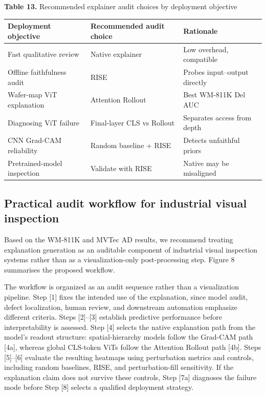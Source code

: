 \documentclass[11pt,a4paper]{article}
\begin{document}
\begin{center}
\small \textbf{Table 13.} Recommended explainer audit choices by deployment objective
\end{center}

\begin{tabular}{lll}
\toprule
Deployment objective & Recommended audit choice & Rationale \\
\midrule
Fast qualitative review & Native explainer & Low overhead, compatible \\
Offline faithfulness audit & RISE & Probes input--output directly \\
Wafer-map ViT explanation & Attention Rollout & Best WM-811K Del AUC \\
Diagnosing ViT failure & Final-layer CLS vs Rollout & Separates access from depth \\
CNN Grad-CAM reliability & Random baseline + RISE & Detects unfaithful priors \\
Pretrained-model inspection & Validate with RISE & Native may be misaligned \\
\bottomrule
\end{tabular}

\clearpage
\subsection{Practical audit workflow for industrial visual inspection}

Based on the WM-811K and MVTec AD results, we recommend treating explanation generation as an auditable component of industrial visual inspection systems rather than as a visualization-only post-processing step. Figure 8 summarises the proposed workflow.

The workflow is organized as an audit sequence rather than a visualization pipeline. Step [1] fixes the intended use of the explanation, since model audit, defect localization, human review, and downstream automation emphasize different criteria. Steps [2]--[3] establish predictive performance before interpretability is assessed. Step [4] selects the native explanation path from the model's readout structure: spatial-hierarchy models follow the Grad-CAM path [4a], whereas global CLS-token ViTs follow the Attention Rollout path [4b]. Steps [5]--[6] evaluate the resulting heatmaps using perturbation metrics and controls, including random baselines, RISE, and perturbation-fill sensitivity. If the explanation claim does not survive these controls, Step [7a] diagnoses the failure mode before Step [8] selects a qualified deployment strategy.
\end{document}
